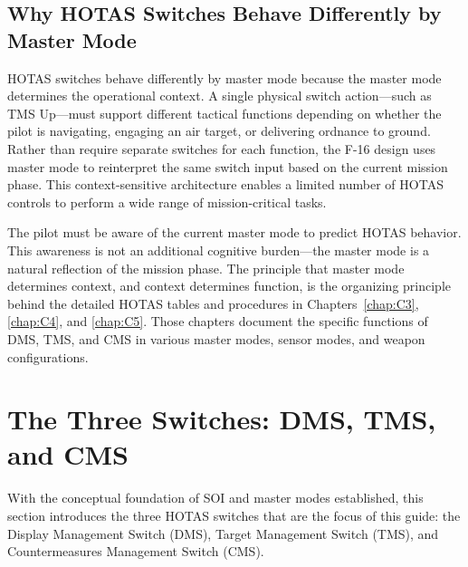 \documentclass[11pt, a4paper, twoside]{report}
\begin{document}

\subsection{Why HOTAS Switches Behave Differently by Master Mode}
\label{sec:C2-S2-S2}

HOTAS switches behave differently by master mode because the master mode determines the operational context. A single physical switch action—such as TMS Up—must support different tactical functions depending on whether the pilot is navigating, engaging an air target, or delivering ordnance to ground. Rather than require separate switches for each function, the F-16 design uses master mode to reinterpret the same switch input based on the current mission phase. This context-sensitive architecture enables a limited number of HOTAS controls to perform a wide range of mission-critical tasks.

The pilot must be aware of the current master mode to predict HOTAS behavior. This awareness is not an additional cognitive burden—the master mode is a natural reflection of the mission phase. The principle that master mode determines context, and context determines function, is the organizing principle behind the detailed HOTAS tables and procedures in Chapters~\ref{chap:C3}, \ref{chap:C4}, and \ref{chap:C5}. Those chapters document the specific functions of DMS, TMS, and CMS in various master modes, sensor modes, and weapon configurations.


\section{The Three Switches: DMS, TMS, and CMS}
\label{sec:C2-S3}

With the conceptual foundation of SOI and master modes established, this section introduces the three HOTAS switches that are the focus of this guide: the Display Management Switch (DMS), Target Management Switch (TMS), and Countermeasures Management Switch (CMS).
\end{document}
